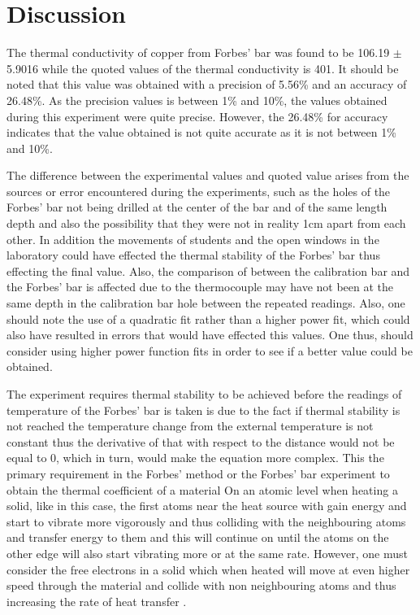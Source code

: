 \documentclass[12pt, a4paper]{article}
\begin{document}
\section*{Discussion}
The thermal conductivity of copper from Forbes' bar was found to be 106.19 $\pm$ 5.9016 while the quoted values of the thermal conductivity is 401\parencite{thermalconductivityofmetals}. It should be noted that this value was obtained with a precision of 5.56\% and an accuracy of 26.48\%. As the precision values is between 1\% and 10\%, the values obtained during this experiment were quite precise. However, the 26.48\% for accuracy indicates that the value obtained is not quite accurate as it is not between 1\% and 10\%. 


\noindent
The difference between the experimental values and quoted value arises from the sources or error encountered during the experiments, such as the holes of the Forbes' bar not being drilled at the center of the bar and of the same length depth and also the possibility that they were not in reality 1cm apart from each other. In addition the movements of students and the open windows in the laboratory could have effected the thermal stability of the Forbes' bar thus effecting the final value. Also, the comparison of between the calibration bar and the Forbes' bar is affected due to the thermocouple may have not been at the same depth in the calibration bar hole between the repeated readings. Also, one should note the use of a quadratic fit rather than a higher power fit, which could also have resulted in errors that would have effected this values. One thus, should consider using higher power function fits in order to see if a better value could be obtained. 


\noindent
The experiment requires thermal stability to be achieved before the readings of temperature of the Forbes' bar is taken is due to the fact if thermal stability is not reached the temperature change from the external temperature is not constant thus the derivative of that with respect to the distance would not be equal to 0, which in turn, would make the equation more complex. This the primary requirement in the Forbes' method or the Forbes' bar experiment to obtain the thermal coefficient of a material \parencite{thermobook} On an atomic level when heating a solid, like in this case, the first atoms near the heat source with gain energy and start to vibrate more vigorously and thus colliding with the neighbouring atoms and transfer energy to them and this will continue on until the atoms on the other edge will also start vibrating more or at the same rate. However, one must consider the free electrons in a solid which when heated will move at even higher speed through the material and collide with non neighbouring atoms and thus increasing the rate of heat transfer \parencite{muncaster}. 
\end{document}
